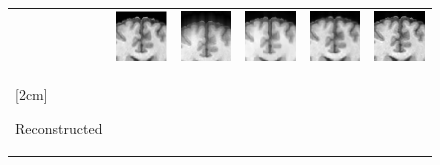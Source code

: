 \documentclass[review]{elsarticle}
\begin{document}
\begin{figure}
\begin{raggedright}
\begin{tabular}{>{\centering}b{0.2cm}lcccc}
{\begin{turn}{90}
					\end{turn}} & \includegraphics[width=2.5cm]{include/grp1/res1_org_zoom} & \includegraphics[width=2.5cm]{include/grp1/res1_zero_zoom} & \includegraphics[width=2.5cm]{include/grp1/res1_cs_zoom} & \includegraphics[width=2.5cm]{include/grp1/res1_L2_zoom} & \includegraphics[width=2.5cm]{include/grp1/res1_our_zoom}\tabularnewline
					\multirow{1}{0.2cm}[2cm]{\begin{turn}{90}
							{\footnotesize{}Reconstructed}

\end{turn}}
\end{tabular}
\end{raggedright}
\end{figure}
\end{document}
